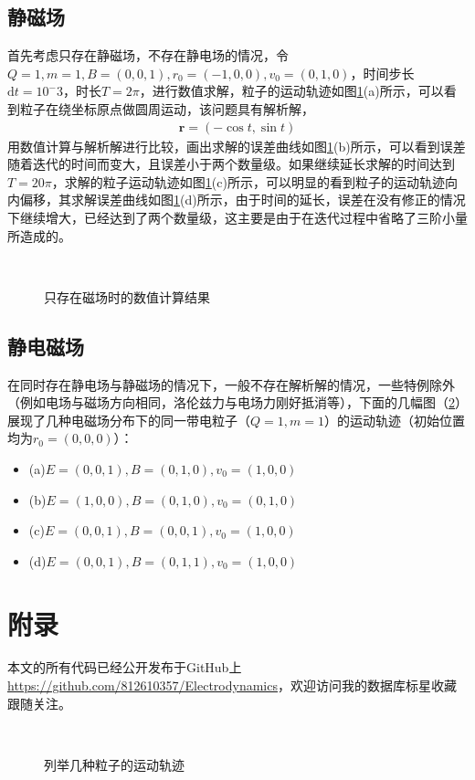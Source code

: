 \documentclass{article} %
\renewcommand{\vec}[1]{\boldsymbol{#1}} %
\begin{document}
\subsection{静磁场}
首先考虑只存在静磁场，不存在静电场的情况，令$Q=1,m=1,B=(0,0,1),r_0=(-1,0,0),v_0=(0,1,0)$，时间步长$\mathrm{d}t=10^-3$，时长$T=2\pi$，进行数值求解，粒子的运动轨迹如图\ref{F2}(a)所示，可以看到粒子在绕坐标原点做圆周运动，该问题具有解析解，
\begin{align}
    \vec{r}=(-\cos t,\sin t)
\end{align}
用数值计算与解析解进行比较，画出求解的误差曲线如图\ref{F2}(b)所示，可以看到误差随着迭代的时间而变大，且误差小于两个数量级。如果继续延长求解的时间达到$T=20\pi$，求解的粒子运动轨迹如图\ref{F2}(c)所示，可以明显的看到粒子的运动轨迹向内偏移，其求解误差曲线如图\ref{F2}(d)所示，由于时间的延长，误差在没有修正的情况下继续增大，已经达到了两个数量级，这主要是由于在迭代过程中省略了三阶小量所造成的。
\begin{figure}
    \\
    \caption{只存在磁场时的数值计算结果}
    \label{F2}
\end{figure}

\subsection{静电磁场}
在同时存在静电场与静磁场的情况下，一般不存在解析解的情况，一些特例除外（例如电场与磁场方向相同，洛伦兹力与电场力刚好抵消等），下面的几幅图（\ref{F2.1}）展现了几种电磁场分布下的同一带电粒子（$Q=1,m=1$）的运动轨迹（初始位置均为$r_0=(0,0,0)$）：
\begin{itemize}
    \item (a)$E=(0,0,1),B=(0,1,0),v_0=(1,0,0)$
    \item (b)$E=(1,0,0),B=(0,1,0),v_0=(0,1,0)$
    \item (c)$E=(0,0,1),B=(0,0,1),v_0=(1,0,0)$
    \item (d)$E=(0,0,1),B=(0,1,1),v_0=(1,0,0)$
\end{itemize}

\section{附录}
本文的所有代码已经公开发布于GitHub上\url{https://github.com/812610357/Electrodynamics}，欢迎访问我的数据库标星收藏跟随关注。

\begin{figure}
    \\
    \caption{列举几种粒子的运动轨迹}
    \label{F2.1}
\end{figure}
\end{document}
